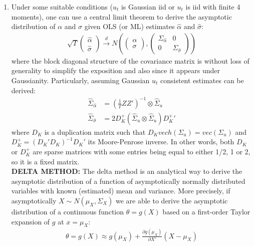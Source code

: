 \begin{enumerate}
\item Under some suitable conditions (\(u_t\) is Gaussian iid or \(u_t\) is iid with finite 4 moments),
  one can use a central limit theorem to derive the asymptotic distribution of \(\alpha\) and \(\sigma\)
  given OLS (or ML) estimates \(\hat{\alpha}\) and \(\hat{\sigma}\):
\begin{align*}
  \sqrt{T} \begin{pmatrix} \hat{\alpha}\\ \hat{\sigma}\end{pmatrix} \overset{d}{\longrightarrow} N\left( \begin{pmatrix} \alpha \\ \sigma \end{pmatrix}, \begin{pmatrix} \Sigma_{\hat{\alpha}} & 0 \\ 0 & \Sigma_{\hat{\sigma}}\end{pmatrix} \right)
\end{align*}
  where the block diagonal structure of the covariance matrix is without loss of generality
  to simplify the exposition and also since it appears under Gaussianity.
Particularly, assuming Gaussian \(u_t\) consistent estimates can be derived:
\begin{align*}
  \hat{\Sigma}_{\hat{\alpha}} &= \left(\frac{1}{T} Z Z'\right)^{-1} \otimes \hat{\Sigma}_u
  \\
  \hat{\Sigma}_{\hat{\sigma}} &= 2 D_K^{+} \left(\hat{\Sigma}_u \otimes \hat{\Sigma}_u \right) {D_K^{+}}'
\end{align*}
where \(D_K\) is a duplication matrix such that \(D_K vech(\Sigma_u) = vec(\Sigma_u)\) and \(D_K^{+} = {(D_K' D_K)}^{-1} D_K'\) its Moore-Penrose inverse.
In other words, both \(D_K\) or \(D_K^{+}\) are sparse matrices with some entries being equal to either 1/2, 1 or 2,
  so it is a fixed matrix.
\\
\noindent\textbf{DELTA METHOD:}
The delta method is an analytical way to derive the asymptotic distribution of a function of asymptotically normally distributed variables
  with known (estimated) mean and variance.
More precisely, if asymptotically \(X \sim N(\mu_X,\Sigma_X)\)
  we are able to derive the asymptotic distribution of a continuous function \(\theta = g(X)\) based on a first-order Taylor expansion of \(g\) at \(x = \mu_X\):
\begin{align*}
  \theta = g(X) \approx g(\mu_X) + \frac{\partial g(\mu_X)}{\partial X'} (X - \mu_X)

\end{align*}
\end{enumerate}
